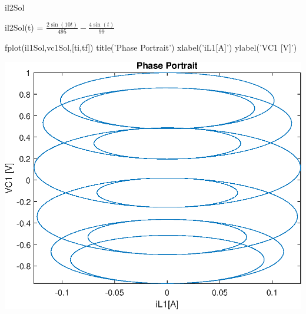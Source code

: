 \documentclass[10pt,a4paper]{article} %
\begin{document}
\begin{matlabcode}
	il2Sol
\end{matlabcode}
\begin{matlabsymbolicoutput}
	il2Sol(t) = 
	$\displaystyle \frac{2 \sin \left(10 t\right)}{495}-\frac{4 \sin \left(t\right)}{99}$
\end{matlabsymbolicoutput}


\vspace{1em}

\begin{matlabcode}
	fplot(il1Sol,vc1Sol,[ti,tf])
	title('Phase Portrait')
	xlabel('iL1[A]')
	ylabel('VC1 [V]')
\end{matlabcode}
\begin{center}
	\includegraphics[width=\maxwidth{56.196688409433015em}]{figure_0_10}
\end{center}
\end{document}
